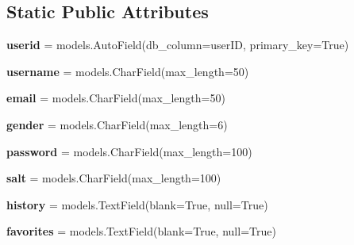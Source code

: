 \subsection*{Static Public Attributes}
\begin{DoxyCompactItemize}
\item 
\mbox{\label{classprodigal__app_1_1models_1_1_user_a23f70d4dd0ba585dabbabc27a329757b}} 
{\bfseries userid} = models.\+Auto\+Field(db\+\_\+column=\textquotesingle{}user\+ID\textquotesingle{}, primary\+\_\+key=True)
\item 
\mbox{\label{classprodigal__app_1_1models_1_1_user_a8278fa688d753a0fa059a60ea7d9df3b}} 
{\bfseries username} = models.\+Char\+Field(max\+\_\+length=50)
\item 
\mbox{\label{classprodigal__app_1_1models_1_1_user_afa7e9a444f0466918d17df37edcc9b34}} 
{\bfseries email} = models.\+Char\+Field(max\+\_\+length=50)
\item 
\mbox{\label{classprodigal__app_1_1models_1_1_user_af81981104c4ccd2ba12a4b9768e669eb}} 
{\bfseries gender} = models.\+Char\+Field(max\+\_\+length=6)
\item 
\mbox{\label{classprodigal__app_1_1models_1_1_user_a2a239a32008255ebd4fc27fe85840daa}} 
{\bfseries password} = models.\+Char\+Field(max\+\_\+length=100)
\item 
\mbox{\label{classprodigal__app_1_1models_1_1_user_a5ae0963214f6886b01bd7c5629c3a82c}} 
{\bfseries salt} = models.\+Char\+Field(max\+\_\+length=100)
\item 
\mbox{\label{classprodigal__app_1_1models_1_1_user_a6ce9b2a0de5b75e3485f680f8a385c28}} 
{\bfseries history} = models.\+Text\+Field(blank=True, null=True)
\item 
\mbox{\label{classprodigal__app_1_1models_1_1_user_ac9c0ed9b8c772809846d7be53198fc08}} 
{\bfseries favorites} = models.\+Text\+Field(blank=True, null=True)
\end{DoxyCompactItemize}


